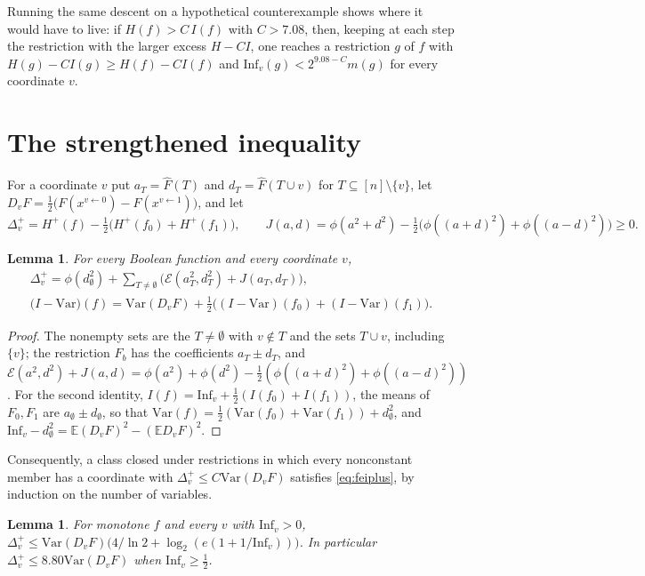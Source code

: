 \documentclass[11pt]{amsart}
\newtheorem{lemma}[theorem]{Lemma}
\theoremstyle{remark}
\newcommand{\E}{\mathbb{E}}
\newcommand{\Inf}{\mathrm{Inf}}
\newcommand{\Var}{\mathrm{Var}}
\begin{document}
Running the same descent on a hypothetical counterexample shows where it would have to live: if $H(f)>C\,I(f)$ with
$C>7.08$, then, keeping at each step the restriction with the larger excess $H-CI$, one reaches a restriction $g$ of
$f$ with $H(g)-CI(g)\ge H(f)-CI(f)$ and $\Inf_v(g)<2^{9.08-C}m(g)$ for every coordinate $v$.

\section{The strengthened inequality}\label{sec:plus}

For a coordinate $v$ put $a_T=\widehat F(T)$ and $d_T=\widehat F(T\cup v)$ for $T\subseteq[n]\setminus\{v\}$, let
$D_vF=\frac12\bigl(F(x^{v\leftarrow0})-F(x^{v\leftarrow1})\bigr)$, and let
\[
\Delta^+_v=H^+(f)-\tfrac12\bigl(H^+(f_0)+H^+(f_1)\bigr),\qquad
J(a,d)=\phi(a^2+d^2)-\tfrac12\bigl(\phi((a+d)^2)+\phi((a-d)^2)\bigr)\ge0 .
\]

\begin{lemma}\label{lem:plusstep}
For every Boolean function and every coordinate $v$,
\begin{gather*}
\Delta^+_v=\phi(d_\emptyset^2)+\sum_{T\neq\emptyset}\bigl(\mathcal E(a_T^2,d_T^2)+J(a_T,d_T)\bigr),\\
\bigl(I-\Var\bigr)(f)=\Var(D_vF)+\tfrac12\bigl((I-\Var)(f_0)+(I-\Var)(f_1)\bigr).
\end{gather*}
\end{lemma}

\begin{proof}
The nonempty sets are the $T\neq\emptyset$ with $v\notin T$ and the sets $T\cup v$, including $\{v\}$; the restriction
$F_b$ has the coefficients $a_T\pm d_T$, and $\mathcal E(a^2,d^2)+J(a,d)=\phi(a^2)+\phi(d^2)-\frac12(\phi((a+d)^2)+
\phi((a-d)^2))$. For the second identity, $I(f)=\Inf_v+\frac12(I(f_0)+I(f_1))$, the means of $F_0,F_1$ are
$a_\emptyset\pm d_\emptyset$, so that $\Var(f)=\frac12(\Var(f_0)+\Var(f_1))+d_\emptyset^2$, and
$\Inf_v-d_\emptyset^2=\E(D_vF)^2-(\E D_vF)^2$.
\end{proof}

Consequently, a class closed under restrictions in which every nonconstant member has a coordinate with
$\Delta^+_v\le C\Var(D_vF)$ satisfies \eqref{eq:feiplus}, by induction on the number of variables.

\begin{lemma}\label{lem:neardict}
For monotone $f$ and every $v$ with $\Inf_v>0$,
$\Delta^+_v\le\Var(D_vF)\bigl(4/\ln2+\log_2(e(1+1/\Inf_v))\bigr)$. In particular $\Delta^+_v\le8.80\Var(D_vF)$
when $\Inf_v\ge\frac12$.
\end{lemma}
\end{document}
